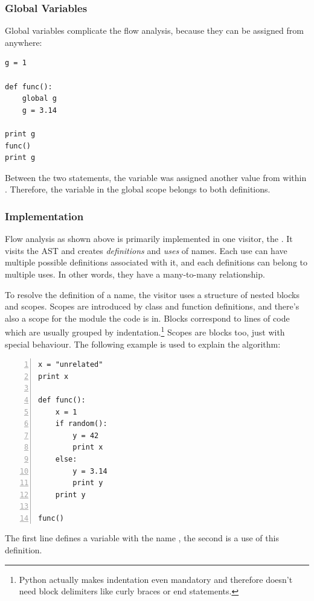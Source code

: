 \documentclass[12pt,halfparskip,DIV11,BCOR10mm]{scrreprt}
\begin{document}
\subsubsection{Global Variables}

Global variables complicate the flow analysis, because they can be assigned from anywhere:

\begin{lstlisting}
g = 1

def func():
    global g
    g = 3.14

print g
func()
print g
\end{lstlisting}

Between the two  statements, the variable  was assigned another value from within . Therefore, the variable  in the global scope belongs to both definitions.

\subsubsection{Implementation}

Flow analysis as shown above is primarily implemented in one visitor, the . It visits the AST and creates \emph{definitions} and \emph{uses} of names. Each use can have multiple possible definitions associated with it, and each definitions can belong to multiple uses. In other words, they have a many-to-many relationship.

To resolve the definition of a name, the visitor uses a structure of nested blocks and scopes. Scopes are introduced by class and function definitions, and there's also a scope for the module the code is in. Blocks correspond to lines of code which are usually grouped by indentation.\footnote{Python actually makes indentation even mandatory and therefore doesn't need block delimiters like curly braces or end statements.} Scopes are blocks too, just with special behaviour. The following example is used to explain the algorithm:

\begin{lstlisting}[numbers=left]
x = "unrelated"
print x

def func():
    x = 1
    if random():
        y = 42
        print x
    else:
        y = 3.14
        print y
    print y

func()
\end{lstlisting}

The first line defines a variable with the name , the second is a use of this definition.
\end{document}
